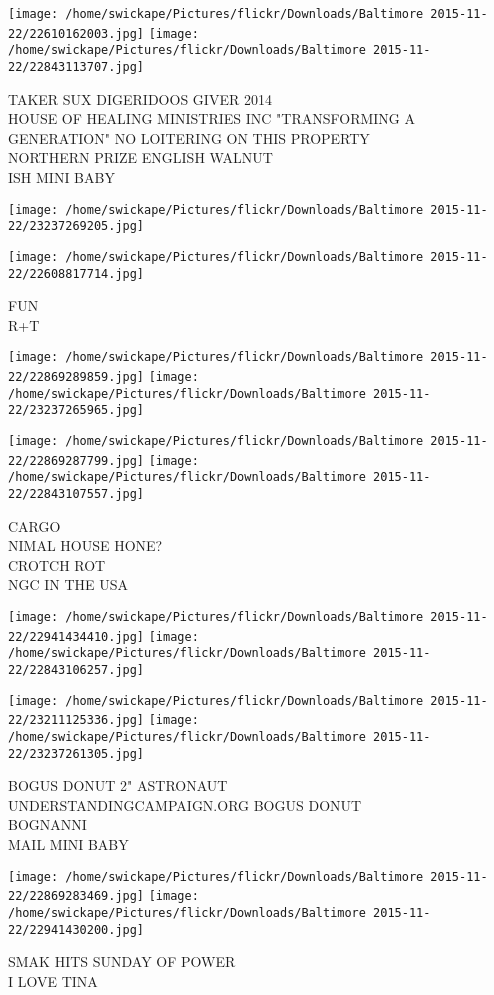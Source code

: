 \documentclass[10pt,letterpaper]{article}
\begin{document}
\texttt{[image: /home/swickape/Pictures/flickr/Downloads/Baltimore 2015-11-22/22610162003.jpg]}
\texttt{[image: /home/swickape/Pictures/flickr/Downloads/Baltimore 2015-11-22/22843113707.jpg]}

TAKER SUX DIGERIDOOS GIVER 2014\\
HOUSE OF HEALING MINISTRIES INC "TRANSFORMING A GENERATION" NO LOITERING ON THIS PROPERTY\\
NORTHERN PRIZE ENGLISH WALNUT\\
ISH MINI BABY
\pagebreak

\texttt{[image: /home/swickape/Pictures/flickr/Downloads/Baltimore 2015-11-22/23237269205.jpg]}

\vspace{0.25in}
\texttt{[image: /home/swickape/Pictures/flickr/Downloads/Baltimore 2015-11-22/22608817714.jpg]}

FUN\\
R+T
\pagebreak

\texttt{[image: /home/swickape/Pictures/flickr/Downloads/Baltimore 2015-11-22/22869289859.jpg]}
\texttt{[image: /home/swickape/Pictures/flickr/Downloads/Baltimore 2015-11-22/23237265965.jpg]}

\texttt{[image: /home/swickape/Pictures/flickr/Downloads/Baltimore 2015-11-22/22869287799.jpg]}
\texttt{[image: /home/swickape/Pictures/flickr/Downloads/Baltimore 2015-11-22/22843107557.jpg]}

CARGO\\
NIMAL HOUSE HONE?\\
CROTCH ROT\\
NGC IN THE USA
\pagebreak

\texttt{[image: /home/swickape/Pictures/flickr/Downloads/Baltimore 2015-11-22/22941434410.jpg]}
\texttt{[image: /home/swickape/Pictures/flickr/Downloads/Baltimore 2015-11-22/22843106257.jpg]}

\texttt{[image: /home/swickape/Pictures/flickr/Downloads/Baltimore 2015-11-22/23211125336.jpg]}
\texttt{[image: /home/swickape/Pictures/flickr/Downloads/Baltimore 2015-11-22/23237261305.jpg]}

BOGUS DONUT 2" ASTRONAUT\\
UNDERSTANDINGCAMPAIGN.ORG BOGUS DONUT\\
BOGNANNI\\
MAIL MINI BABY
\pagebreak

\texttt{[image: /home/swickape/Pictures/flickr/Downloads/Baltimore 2015-11-22/22869283469.jpg]}
\texttt{[image: /home/swickape/Pictures/flickr/Downloads/Baltimore 2015-11-22/22941430200.jpg]}

SMAK HITS SUNDAY OF POWER\\
I LOVE TINA
\pagebreak
\end{document}
